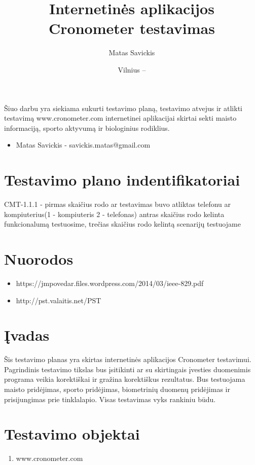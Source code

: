 \documentclass[oneside]{VUMIFPSkursinis}
\title{Internetinės aplikacijos Cronometer testavimas}
\author{Matas Savickis}
\date{Vilnius – \the\year}
\begin{document}
\maketitle

Šiuo darbu yra siekiama sukurti testavimo planą, testavimo atvejus ir atlikti testavimą www.cronometer.com  internetinei aplikacijai skirtai sekti maisto informaciją, sporto aktyvumą ir biologinius rodiklius.

\begin{itemize}
	\item{Matas Savickis - savickis.matas@gmail.com}
\end{itemize}

\tableofcontents


\section{Testavimo plano indentifikatoriai} CMT-1.1.1 - pirmas skaičius rodo ar testavimas buvo atliktas telefonu ar kompiuterius(1 - kompiuteris 2 - telefonas) antras skaičius rodo kelinta funkcionalumą testuosime, trečias skaičius rodo kelintą scenarijų testuojame
\section{Nuorodos}
	\begin{itemize}
		\item{https://jmpovedar.files.wordpress.com/2014/03/ieee-829.pdf}
		\item{http://pst.valaitis.net/PST}
	\end{itemize}
\section{Įvadas}
	Šis testavimo planas yra skirtas internetinės aplikacijos Cronometer testavimui. Pagrindinis testavimo tikslas bus įsitikinti ar su skirtingais įvesties duomenimis programa veikia korektiškai ir gražina korektiškus rezultatus. Bus testuojama maisto pridėjimas, sporto pridėjimas, biometrinių duomenų pridėjimas ir prisijungimas prie tinklalapio. Visas testavimas vyks rankiniu būdu.

\section{Testavimo objektai}
	\begin{enumerate}
		\item{www.cronometer.com}
	\end{enumerate}
\end{document}
